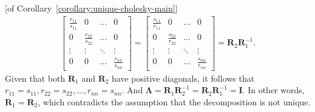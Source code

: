 \documentclass[10pt,a4paper]{amsart}
\newcommand{\bI}{\bm{I}}
\newcommand{\bLambda}{\boldsymbol\Lambda}
\newcommand{\bR}{\bm{R}}
\renewenvironment{proof}{\par\noindent{\bf Proof\ }}{\hfill\BlackBox\\[2mm]}
\begin{document}
\begin{proof}[of Corollary~\ref{corollary:unique-cholesky-main}]
$$\begin{aligned}
\begin{bmatrix}
\frac{r_{11}}{s_{11}} & 0 & \ldots & 0 \\
0 & \frac{r_{22}}{s_{22}} & \ldots & 0\\
\vdots & \vdots & \ddots & \vdots\\
0 & 0 & \ldots & \frac{r_{nn}}{s_{nn}}
\end{bmatrix}
=
\begin{bmatrix}
\frac{s_{11}}{r_{11}} & 0 & \ldots & 0 \\
0 & \frac{s_{22}}{r_{22}} & \ldots & 0\\
\vdots & \vdots & \ddots & \vdots\\
0 & 0 & \ldots & \frac{s_{nn}}{r_{nn}}
\end{bmatrix}
=\bR_2\bR_1^{-1}.
\end{aligned}
$$ 
Given that both $\bR_1$ and $\bR_2$ have positive diagonals, it follows that $r_{11}=s_{11}, r_{22}=s_{22}, \ldots, r_{nn}=s_{nn}$. And $\bLambda = \bR_1\bR_2^{-1}= \bR_2\bR_1^{-1}  =\bI$.
In other words, $\bR_1=\bR_2$, which contradicts the assumption that the decomposition is not unique.
\end{proof}
\end{document}
